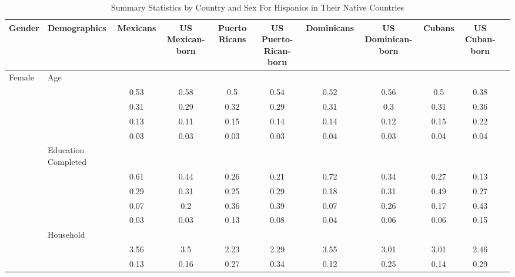 \begin{table}[ht]
\centering
\caption{Summary Statistics by Country and Sex For Hispanics in Their Native Countries} 
\begingroup\small
\begin{tabular}{l>{\raggedright\arraybackslash}p{3.2cm}|ccccccccc}
  \hline
Gender & Demographics & Mexicans & US Mexican-born & Puerto Ricans & US Puerto-Rican-born & Dominicans & US Dominican-born & Cubans & US Cuban-born \\ 
  \hline
Female & Age &  &  &  &  &  &  &  &  \\ 
   & \multicolumn{1}{>{\raggedleft\arraybackslash}p{1.5cm}|}{\makebox[1.5cm][r]{60 - 69 }} & 0.53 & 0.58 & 0.5 & 0.54 & 0.52 & 0.56 & 0.5 & 0.38 \\ 
   & \multicolumn{1}{>{\raggedleft\arraybackslash}p{1.5cm}|}{\makebox[1.5cm][r]{70 - 79 }} & 0.31 & 0.29 & 0.32 & 0.29 & 0.31 & 0.3 & 0.31 & 0.36 \\ 
   & \multicolumn{1}{>{\raggedleft\arraybackslash}p{1.5cm}|}{\makebox[1.5cm][r]{80 - 89 }} & 0.13 & 0.11 & 0.15 & 0.14 & 0.14 & 0.12 & 0.15 & 0.22 \\ 
   & \multicolumn{1}{>{\raggedleft\arraybackslash}p{1.5cm}|}{\makebox[1.5cm][r]{90 plus }} & 0.03 & 0.03 & 0.03 & 0.03 & 0.04 & 0.03 & 0.04 & 0.04 \\ 
   & Education Completed &  &  &  &  &  &  &  &  \\ 
   & \multicolumn{1}{>{\raggedleft\arraybackslash}p{3.2cm}|}{\makebox[3.2cm][r]{Less than Primary }} & 0.61 & 0.44 & 0.26 & 0.21 & 0.72 & 0.34 & 0.27 & 0.13 \\ 
   & \multicolumn{1}{>{\raggedleft\arraybackslash}p{1.7cm}|}{\makebox[1.7cm][r]{Primary }} & 0.29 & 0.31 & 0.25 & 0.29 & 0.18 & 0.31 & 0.49 & 0.27 \\ 
   & \multicolumn{1}{>{\raggedleft\arraybackslash}p{2cm}|}{\makebox[2cm][r]{Secondary }} & 0.07 & 0.2 & 0.36 & 0.39 & 0.07 & 0.26 & 0.17 & 0.43 \\ 
   & \multicolumn{1}{>{\raggedleft\arraybackslash}p{2cm}|}{\makebox[2cm][r]{University }} & 0.03 & 0.03 & 0.13 & 0.08 & 0.04 & 0.06 & 0.06 & 0.15 \\ 
   & Household &  &  &  &  &  &  &  &  \\ 
   & \multicolumn{1}{>{\raggedleft\arraybackslash}p{2.7cm}|}{\makebox[2.7cm][r]{Household Size }} & 3.56 & 3.5 & 2.23 & 2.29 & 3.55 & 3.01 & 3.01 & 2.46 \\ 
   & \multicolumn{1}{>{\raggedleft\arraybackslash}p{2.2cm}|}{\makebox[2.2cm][r]{Lives Alone }} & 0.13 & 0.16 & 0.27 & 0.34 & 0.12 & 0.25 & 0.14 & 0.29 \\ 

\end{tabular}
\end{table}
